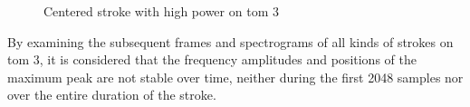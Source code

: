 \begin{figure}
	\centering
	\caption{Centered stroke with high power on tom 3}
	\label{fig:tom32}
\end{figure}

By examining the subsequent frames and spectrograms of all kinds of strokes on tom 3, it is considered that the frequency amplitudes and positions of the maximum peak are not stable over time, neither during the first 2048 samples nor over the entire duration of the stroke.

